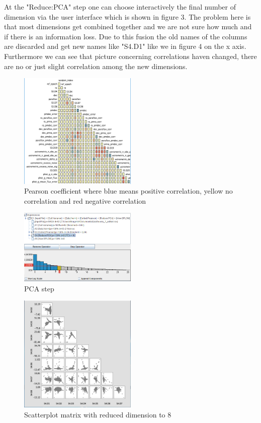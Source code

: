 \documentclass{vgtc}                          %
\begin{document}
At the "Reduce:PCA" step one can choose interactively the final number of dimension via the user interface which is shown in figure 3. The problem here is that most dimensions get combined together and we are not sure how much and if there is an information loss. Due to this fusion the old names of the columns are discarded and get new names like "S4.D1" like we in figure 4 on the x axis. Furthermore we can see that picture concerning correlations haven changed, there are no or just slight correlation among the new dimensions.
\begin{figure}[H]
\includegraphics[width=0.5\textwidth]{pearsoncoeff.PNG}
\centering
\caption{Pearson coefficient where blue means positive correlation, yellow no correlation and red negative correlation}
\end{figure}
\begin{figure}[H]
\includegraphics[width=0.5\textwidth]{pca.PNG}
\centering
\caption{PCA step}
\end{figure}
\begin{figure}[H]
\includegraphics[width=0.5\textwidth]{splom.PNG}
\centering
\caption{Scatterplot matrix with reduced dimension to 8}
\end{figure}
\end{document}
